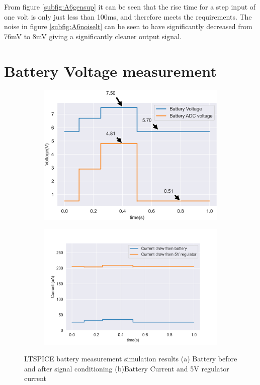 From figure \ref{subfig:A6gensup} it can be seen that the rise time for a step input of one volt is only just less than 100ms, and therefore meets the requirements. The noise in figure \ref{subfig:A6noiselt} can be seen to have significantly decreased from 76mV to 8mV giving a significantly cleaner output signal.

\newpage
\section{Battery Voltage measurement}



\begin{figure}[!htb]
	\footnotesize
	\centering
	\begin{subfigure}[]{0.386\textwidth}
		\centering
		\includegraphics[width=1\linewidth]{./Figures/A6/A6batvolt.png}
		\caption{} \label{subfig:voltbatA6}
	\end{subfigure}
	\begin{subfigure}[]{0.46\textwidth}
		\centering
		\includegraphics[width=1\linewidth]{./Figures/A6/A6batcurrent.png}
		\caption{ } \label{subfig:currbatA6}
	\end{subfigure}
	\caption[{LTSPICE battery measurement simulation results}]{LTSPICE battery measurement simulation results   (a)  Battery before and after signal conditioning (b)Battery Current and 5V regulator current }
	\label{fig:A6bat}
\end{figure}

